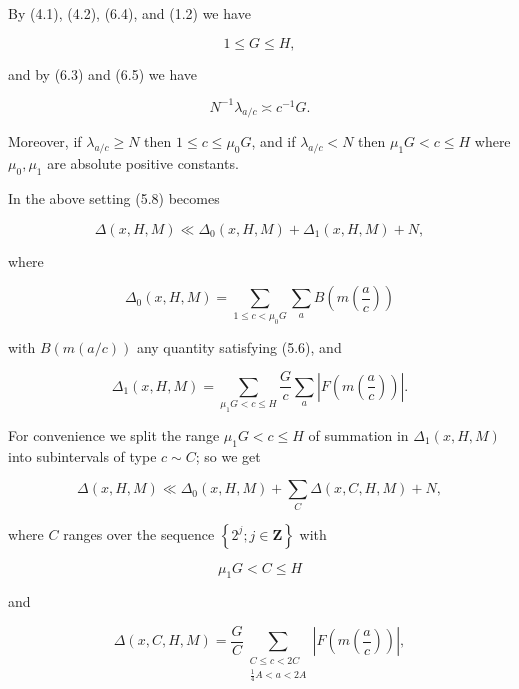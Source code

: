 \documentclass[10pt]{article}
\begin{document}
By (4.1), (4.2), (6.4), and (1.2) we have


\begin{equation*}
1 \leqslant G \leqslant H, \tag{6.6}
\end{equation*}


and by (6.3) and (6.5) we have


\begin{equation*}
N^{-1} \lambda_{a / c} \asymp c^{-1} G . \tag{6.7}
\end{equation*}


Moreover, if $\lambda_{a / c} \geqslant N$ then $1 \leqslant c \leqslant \mu_{0} G$, and if $\lambda_{a / c}<N$ then $\mu_{1} G<c \leqslant H$ where $\mu_{0}, \mu_{1}$ are absolute positive constants.

In the above setting (5.8) becomes


\begin{equation*}
\Delta(x, H, M) \ll \Delta_{0}(x, H, M)+\Delta_{1}(x, H, M)+N, \tag{6.8}
\end{equation*}


where

$$
\Delta_{0}(x, H, M)=\sum_{1 \leqslant c<\mu_{0} G} \sum_{a} B\left(m\left(\frac{a}{c}\right)\right)
$$

with $B(m(a/c))$ any quantity satisfying (5.6), and

$$
\Delta_{1}(x, H, M)=\sum_{\mu_{1} G<c \leqslant H} \frac{G}{c} \sum_{a}\left|F\left(m\left(\frac{a}{c}\right)\right)\right| .
$$

For convenience we split the range $\mu_{1}G<c\leqslant H$ of summation in $\Delta_{1}(x,H,M)$ into subintervals of type $c \sim C$; so we get


\begin{equation*}
\Delta(x, H, M) \ll \Delta_{0}(x, H, M)+\sum_{C} \Delta(x, C, H, M)+N, \tag{6.9}
\end{equation*}


where $C$ ranges over the sequence $\left\{2^{j} ; j \in \mathbf{Z}\right\}$ with


\begin{equation*}
\mu_{1} G<C \leqslant H \tag{6.10}
\end{equation*}


and


\begin{equation*}
\Delta(x,C,H,M)=\frac{G}{C}
\sum_{\substack{C\leqslant c<2C\\ \frac14 A<a<2A}}
\left|F\left(m\left(\frac ac\right)\right)\right|, \tag{6.11}
\end{equation*}
\end{document}
